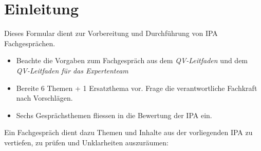 \section{Einleitung}

Dieses Formular dient zur Vorbereitung und Durchführung von IPA Fachgesprächen.

\begin{itemize}
  \item Beachte die Vorgaben zum Fachgespräch aus dem \textit{QV-Leitfaden} und dem \textit{QV-Leitfaden für das Expertenteam}
  \item Bereite 6 Themen + 1 Ersatzthema vor. Frage die verantwortliche Fachkraft nach Vorschlägen.
  \item Sechs Gesprächsthemen fliessen in die Bewertung der IPA ein.
\end{itemize}

Ein Fachgespräch dient dazu Themen und Inhalte aus der vorliegenden IPA zu vertiefen, zu prüfen und Unklarheiten auszuräumen:

